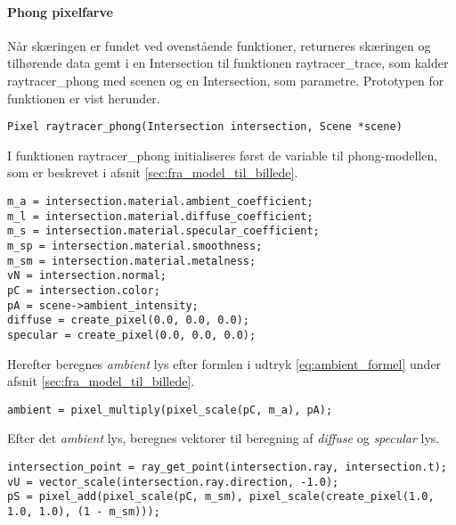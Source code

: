 \paragraph{Phong pixelfarve}
Når skæringen er fundet ved ovenstående funktioner, returneres skæringen og tilhørende data gemt i en Intersection til funktionen raytracer\_trace, som kalder raytracer\_phong med scenen og en Intersection, som parametre. Prototypen for funktionen er vist herunder.

\begin{lstlisting}[style=Cstyle, caption=prototypen til funktionen der beregner pixelfarven på baggrund af data fra skæring med scenen.]
Pixel raytracer_phong(Intersection intersection, Scene *scene)
\end{lstlisting}

I funktionen raytracer\_phong initialiseres først de variable til phong-modellen, som er beskrevet i afsnit
 \ref{sec:fra_model_til_billede}.

\begin{lstlisting}[style=Cstyle, caption=Initialisering af variabler i raytracer\_phong.] 
m_a = intersection.material.ambient_coefficient;
m_l = intersection.material.diffuse_coefficient;
m_s = intersection.material.specular_coefficient;
m_sp = intersection.material.smoothness;
m_sm = intersection.material.metalness;
vN = intersection.normal;
pC = intersection.color;
pA = scene->ambient_intensity;
diffuse = create_pixel(0.0, 0.0, 0.0);
specular = create_pixel(0.0, 0.0, 0.0);
\end{lstlisting}

Herefter beregnes \textit{ambient} lys efter formlen i udtryk \ref{eq:ambient_formel} under afsnit \ref{sec:fra_model_til_billede}.

\begin{lstlisting}[style=Cstyle, caption=Beregning af ambient lys i raytracer\_phong.] 
ambient = pixel_multiply(pixel_scale(pC, m_a), pA);
\end{lstlisting}

Efter det \textit{ambient} lys, beregnes vektorer til beregning af \textit{diffuse} og \textit{specular} lys.

\begin{lstlisting}[style=Cstyle, caption={Beregning af skæring, vektor $\protect\vv{U}$ og pixel S i raytracer\_phong.}] 
intersection_point = ray_get_point(intersection.ray, intersection.t);
vU = vector_scale(intersection.ray.direction, -1.0);
pS = pixel_add(pixel_scale(pC, m_sm), pixel_scale(create_pixel(1.0, 1.0, 1.0), (1 - m_sm)));
\end{lstlisting}


